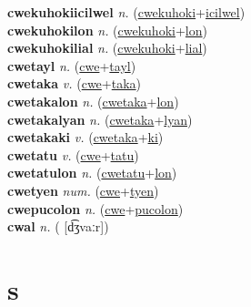 \textbf{cwekuhokiicilwel} \textit{n.} (\hyperref[cwekuhoki]{cwekuhoki}+\hyperref[icilwel]{icilwel})
 \label{cwekuhokiicilwel} \\
\textbf{cwekuhokilon} \textit{n.} (\hyperref[cwekuhoki]{cwekuhoki}+\hyperref[lon]{lon})
 \label{cwekuhokilon} \\
\textbf{cwekuhokilial} \textit{n.} (\hyperref[cwekuhoki]{cwekuhoki}+\hyperref[lial]{lial})
 \label{cwekuhokilial} \\
\textbf{cwetayl} \textit{n.} (\hyperref[cwe]{cwe}+\hyperref[tayl]{tayl})
 \label{cwetayl} \\
\textbf{cwetaka} \textit{v.} (\hyperref[cwe]{cwe}+\hyperref[taka]{taka})
 \label{cwetaka} \\
\textbf{cwetakalon} \textit{n.} (\hyperref[cwetaka]{cwetaka}+\hyperref[lon]{lon})
 \label{cwetakalon} \\
\textbf{cwetakalyan} \textit{n.} (\hyperref[cwetaka]{cwetaka}+\hyperref[lyan]{lyan})
 \label{cwetakalyan} \\
\textbf{cwetakaki} \textit{v.} (\hyperref[cwetaka]{cwetaka}+\hyperref[ki]{ki})
 \label{cwetakaki} \\
\textbf{cwetatu} \textit{v.} (\hyperref[cwe]{cwe}+\hyperref[tatu]{tatu})
 \label{cwetatu} \\
\textbf{cwetatulon} \textit{n.} (\hyperref[cwetatu]{cwetatu}+\hyperref[lon]{lon})
 \label{cwetatulon} \\
\textbf{cwetyen} \textit{num.} (\hyperref[cwe]{cwe}+\hyperref[tyen]{tyen})
 \label{cwetyen} \\
\textbf{cwepucolon} \textit{n.} (\hyperref[cwe]{cwe}+\hyperref[pucolon]{pucolon})
 \label{cwepucolon} \\
\textbf{cwal} \textit{n.} ( [d͡ʒvaːr])
 \label{cwal} 

\section{s}

